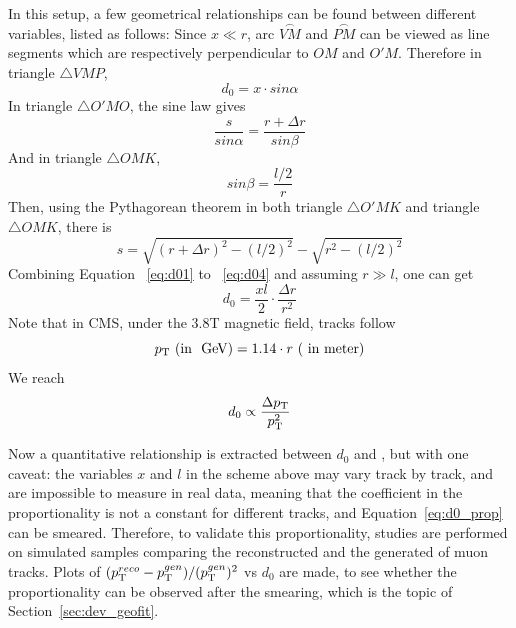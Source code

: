 In this setup, a few geometrical relationships can be found between different variables, listed as follows:
Since $x \ll r$, arc $\stackrel{\frown}{VM}$ and $\stackrel{\frown}{PM}$ can be viewed as line segments which are respectively perpendicular to $OM$ and $O'M$.
Therefore in triangle $\triangle VMP$, 
\begin{equation}\label{eq:d01}
      d_0 = x \cdot sin\alpha
\end{equation}      
In triangle $\triangle O'MO$, the sine law gives
\begin{equation}\label{eq:d02}
      \frac{s}{sin\alpha} = \frac{r+\Delta{}r}{sin\beta}
\end{equation}
And in triangle $\triangle OMK$, 
\begin{equation}\label{eq:d03}
      sin\beta = \frac{l/2}{r}
\end{equation}   
Then, using the Pythagorean theorem in both triangle $\triangle O'MK$ and triangle $\triangle OMK$, there is
\begin{equation}\label{eq:d04}
      s =  \sqrt{(r+\Delta{}r)^{2} - (l/2)^{2}} - \sqrt{r^{2} - (l/2)^{2}}
\end{equation}   
Combining Equation ~\ref{eq:d01} to ~\ref{eq:d04} and assuming $r \gg l$, one can get
\begin{equation}\label{eq:d05}
      d_0 = \frac{xl}{2} \cdot \frac{\Delta{}r}{r^{2}}
\end{equation}  
Note that in CMS, under the 3.8T magnetic field, tracks follow 
\begin{equation}
    p_{\mathrm{T}} ~(\text{in ~\ensuremath{\mbox{GeV}}}) = 1.14 \cdot r ~(~\text{in meter})   
\end{equation}
We reach
\begin{equation}\label{eq:d0_prop}
    d_0 \propto \frac{\Delta{}p_{\mathrm{T}}}{p_{\mathrm{T}}^{2}}
\end{equation}

Now a quantitative relationship is extracted between $d_0$ and \pt, but with one caveat:
the variables $x$ and $l$ in the scheme above may vary track by track, and are impossible to measure in real data,
meaning that the coefficient in the proportionality is not a constant for different tracks, and Equation~\ref{eq:d0_prop} can be smeared.
Therefore, to validate this proportionality, studies are performed on simulated samples comparing the reconstructed \pt and the generated \pt of muon tracks.
Plots of $(p_{\mathrm{T}}^{reco}-p_{\mathrm{T}}^{gen})/ (p_{\mathrm{T}}^{gen})^{2}$ vs $d_0$ are made, 
to see whether the proportionality can be observed after the smearing,
which is the topic of Section~\ref{sec:dev_geofit}.

